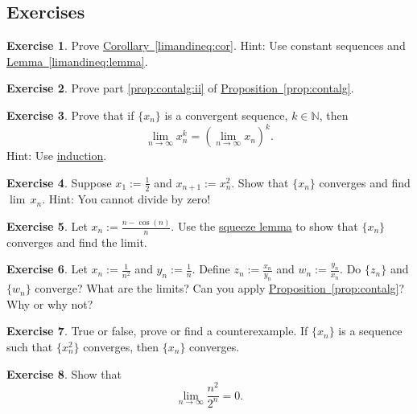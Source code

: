 \documentclass[12pt]{book}
\newcommand{\N}{{\mathbb{N}}}
\theoremstyle{plain}
\theoremstyle{remark}
\theoremstyle{definition}
\theoremstyle{exercise}
\newtheorem{exercise}{Exercise}[section]
\theoremstyle{example}
\newcommand{\propref}[1]{\hyperref[#1]{Proposition~\ref*{#1}}}
\newcommand{\lemmaref}[1]{\hyperref[#1]{Lemma~\ref*{#1}}}
\newcommand{\corref}[1]{\hyperref[#1]{Corollary~\ref*{#1}}}
\begin{document}
\subsection{Exercises}

\begin{exercise}
Prove \corref{limandineq:cor}.  Hint: Use constant sequences
and \lemmaref{limandineq:lemma}.
\end{exercise}

\begin{exercise}
Prove part \ref{prop:contalg:ii} of \propref{prop:contalg}.
\end{exercise}

\begin{exercise}
Prove that if $\{ x_n \}$ is a convergent sequence, $k \in \N$, then
\begin{equation*}
\lim_{n\to\infty} x_n^k = 
{\left( \lim_{n\to\infty} x_n \right)}^k .
\end{equation*}
Hint: Use \hyperref[induction:thm]{induction}.
\end{exercise}

\begin{exercise}
Suppose $x_1 := \frac{1}{2}$ and $x_{n+1} := x_n^2$.  Show that
$\{ x_n \}$ converges and find
$\lim\, x_n$.  Hint: You cannot divide by zero!
\end{exercise}

\begin{exercise}
Let $x_n := \frac{n-\cos(n)}{n}$.  Use the
\hyperref[squeeze:lemma]{squeeze lemma} to show that
$\{ x_n \}$ converges and find the limit.
\end{exercise}

\begin{exercise}
Let $x_n := \frac{1}{n^2}$ and $y_n := \frac{1}{n}$.  Define
$z_n := \frac{x_n}{y_n}$ and 
$w_n := \frac{y_n}{x_n}$.  Do $\{ z_n \}$ and $\{ w_n \}$
converge?  What are the limits?  Can you apply \propref{prop:contalg}?
Why or why not?
\end{exercise}

\begin{exercise}
True or false, prove or find a counterexample.  If $\{ x_n \}$ is a sequence
such that $\{ x_n^2 \}$ converges, then $\{ x_n \}$ converges.
\end{exercise}

\begin{exercise}
Show that
\begin{equation*}
\lim_{n\to\infty} \frac{n^2}{2^n} = 0 .
\end{equation*}
\end{exercise}
\end{document}
